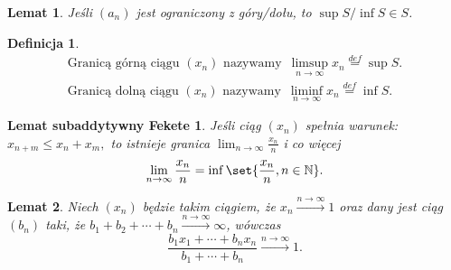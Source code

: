\documentclass{article}
\newcommand{\N}{\mathbb{N}}
\newcommand{\li}{\lim_{n\to\infty}}
\newcommand{\lis}{\limsup_{n\to\infty}}
\newcommand{\lii}{\liminf_{n\to\infty}}
\DeclarePairedDelimiter\set\{\}
\newtheorem*{fekete}{Lemat subaddytywny Fekete}
\newtheorem{lemma}{Lemat}
\newtheorem*{definition}{Definicja}
\begin{document}
\begin{lemma} %
    Jeśli $(a_n)$ jest ograniczony z góry/dołu, to $\sup S/\inf S\in S$.    
\end{lemma}

\begin{definition} %
    \begin{align*}
        \text{Granicą górną ciągu $(x_n)$ nazywamy}\enspace \lis{x_n}\stackrel{def}{=}\sup{S}.\\
        \text{Granicą dolną ciągu $(x_n)$ nazywamy}\enspace \lii{x_n}\stackrel{def}{=}\inf{S}.
    \end{align*}
\end{definition}

\begin{fekete} %
Jeśli ciąg $(x_n)$ spełnia warunek: $x_{n+m}\le x_n+x_m,$
to istnieje granica $\li\frac{x_n}{n}$ i co więcej
    \begin{equation*}
        \li\frac{x_n}{n}=\inf\set{\frac{x_n}{n},n\in\N}.
    \end{equation*}
\end{fekete}

\begin{lemma}
    Niech $(x_n)$ będzie takim ciągiem, że $x_n\stackrel{n\to\infty}{\longrightarrow}1$ 
    oraz dany jest ciąg $(b_n)$ taki, że $b_1+b_2+\cdots+b_n\stackrel{n\to\infty}{\longrightarrow}\infty$,
    wówczas
    \begin{equation*}
        \frac{b_1x_1+\cdots+b_n x_n}{b_1+\cdots+b_n}\stackrel{n\to\infty}{\longrightarrow}1.
    \end{equation*}
\end{lemma}

\end{document}
